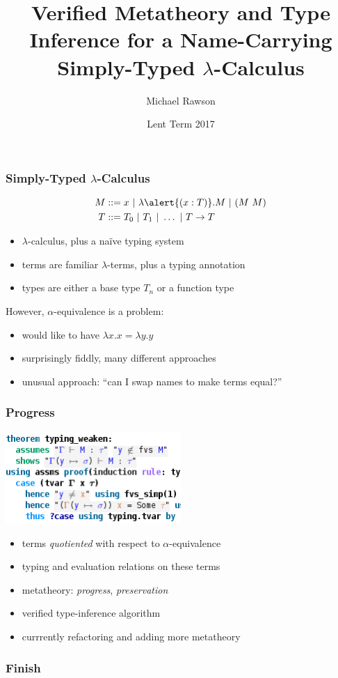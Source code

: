 \documentclass{beamer}
\title{Verified Metatheory and Type Inference for a Name-Carrying Simply-Typed $\lambda$-Calculus}
\author{Michael Rawson}
\date{Lent Term 2017}
\begin{document}
\frame{\titlepage}

\begin{frame}
\frametitle{Simply-Typed $\lambda$-Calculus}
\begin{align*}
M &::= x\ |\ \lambda \alert{(x : T)}.M\ |\ (M\ M)\\
T &::= T_0\ |\ T_1\ |\ \ldots\ |\ T \to T
\end{align*}

\begin{itemize}
\item $\lambda$-calculus, plus a na\"ive typing system
\item terms are familiar $\lambda$-terms, plus a \alert{typing annotation}
\item types are either a base type $T_n$ or a function type
\end{itemize}

However, $\alpha$-equivalence is a problem:
\begin{itemize}
\item would like to have $\lambda x.x = \lambda y.y$
\item surprisingly fiddly, many different approaches
\item unusual approach: ``can I swap names to make terms equal?''
\end{itemize}
\end{frame}

\begin{frame}
\frametitle{Progress}
\begin{center}
\includegraphics[width=0.5\textwidth]{screenshot}
\end{center}

\begin{itemize}
\item terms \emph{quotiented} with respect to $\alpha$-equivalence
\item typing and evaluation relations on these terms
\item metatheory: \emph{progress}, \emph{preservation}
\item verified type-inference algorithm
\item currrently refactoring and adding more metatheory
\end{itemize}
\end{frame}

\begin{frame}
\frametitle{Finish}
\end{frame}
\end{document}
